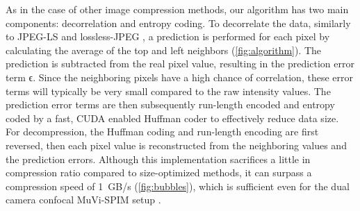     As in the case of other image compression methods, our algorithm has two main components: decorrelation and entropy coding. To decorrelate the data, similarly to JPEG-LS and lossless-JPEG \cite{pennebaker_jpeg:_1992}, a prediction is performed for each pixel by calculating the average of the top and left neighbors (\autoref{fig:algorithm}). The prediction is subtracted from the real pixel value, resulting in the prediction error term ϵ. Since the neighboring pixels have a high chance of correlation, these error terms will typically be very small compared to the raw intensity values. The prediction error terms are then subsequently run-length encoded and entropy coded by a fast, CUDA enabled Huffman coder \cite{treib_interactive_2012,treib_turbulence_2012} to effectively reduce data size. For decompression, the Huffman coding and run-length encoding are first reversed, then each pixel value is reconstructed from the neighboring values and the prediction errors. Although this implementation sacrifices a little in compression ratio compared to size-optimized methods, it can surpass a compression speed of \SI{1}{GB/s} (\autoref{fig:bubbles}), which is sufficient even for the dual camera confocal MuVi-SPIM setup \cite{de_medeiros_confocal_2015}.
    
